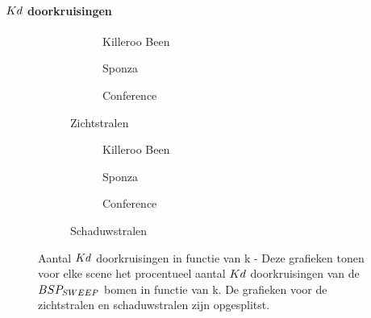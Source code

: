 \paragraph{$\symKd$ doorkruisingen}

\begin{figure}
  \centering
  \begin{subfigure}{\linewidth}
  \centering
  \begin{subfigure}[t]{.32\linewidth}
    \centering
{}
\caption{Killeroo Been}
  \end{subfigure}
  \begin{subfigure}[t]{.32\linewidth}
    \centering
{}
\caption{Sponza}
\end{subfigure}
\begin{subfigure}[t]{.32\linewidth}
  \centering
{}
\caption{Conference}
\end{subfigure}
\caption{Zichtstralen}
\end{subfigure}
\begin{subfigure}{\linewidth}
  \centering
  \begin{subfigure}[t]{.32\linewidth}
    \centering
{}
\caption{Killeroo Been}
  \end{subfigure}
  \begin{subfigure}[t]{.32\linewidth}
    \centering
{}
\caption{Sponza}
\end{subfigure}
\begin{subfigure}[t]{.32\linewidth}
  \centering
{}
\caption{Conference}
\end{subfigure}
\caption{Schaduwstralen}
\end{subfigure}
\caption[Aantal $\symKd$ doorkruisingen in functie van k]{Aantal $\symKd$ doorkruisingen in functie van k - \small Deze grafieken tonen voor elke scene het procentueel aantal $\symKd$ doorkruisingen van de $BSP_{SWEEP}$ bomen in functie van k. De grafieken voor de zichtstralen en schaduwstralen zijn opgesplitst.}
\label{fig:k-kd-doorkruisingen-prec}
\end{figure}


